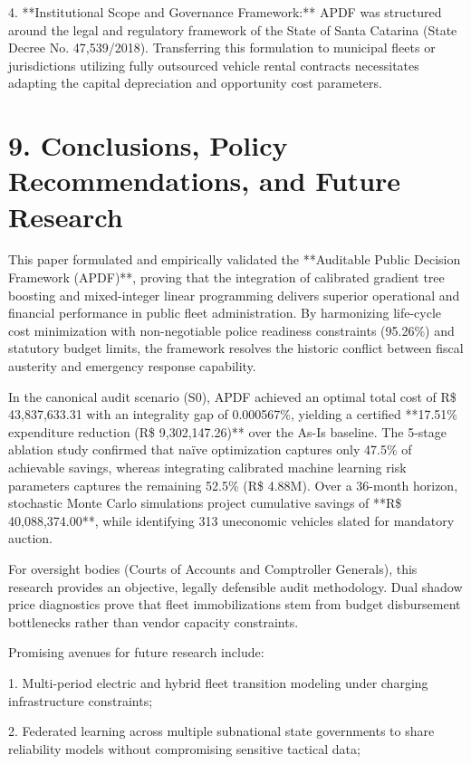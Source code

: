 \documentclass[10pt,a4paper,journal]{article}
\begin{document}
4. **Institutional Scope and Governance Framework:** APDF was structured around the legal and regulatory framework of the State of Santa Catarina (State Decree No. 47,539/2018). Transferring this formulation to municipal fleets or jurisdictions utilizing fully outsourced vehicle rental contracts necessitates adapting the capital depreciation and opportunity cost parameters.

\section{9. Conclusions, Policy Recommendations, and Future Research}
This paper formulated and empirically validated the **Auditable Public Decision Framework (APDF)**, proving that the integration of calibrated gradient tree boosting and mixed-integer linear programming delivers superior operational and financial performance in public fleet administration. By harmonizing life-cycle cost minimization with non-negotiable police readiness constraints (95.26\%) and statutory budget limits, the framework resolves the historic conflict between fiscal austerity and emergency response capability.

In the canonical audit scenario (S0), APDF achieved an optimal total cost of R\$ 43,837,633.31 with an integrality gap of 0.000567\%, yielding a certified **17.51\% expenditure reduction (R\$ 9,302,147.26)** over the As-Is baseline. The 5-stage ablation study confirmed that naïve optimization captures only 47.5\% of achievable savings, whereas integrating calibrated machine learning risk parameters captures the remaining 52.5\% (R\$ 4.88M). Over a 36-month horizon, stochastic Monte Carlo simulations project cumulative savings of **R\$ 40,088,374.00**, while identifying 313 uneconomic vehicles slated for mandatory auction.

For oversight bodies (Courts of Accounts and Comptroller Generals), this research provides an objective, legally defensible audit methodology. Dual shadow price diagnostics prove that fleet immobilizations stem from budget disbursement bottlenecks rather than vendor capacity constraints.

Promising avenues for future research include:

1. Multi-period electric and hybrid fleet transition modeling under charging infrastructure constraints;

2. Federated learning across multiple subnational state governments to share reliability models without compromising sensitive tactical data;
\end{document}

